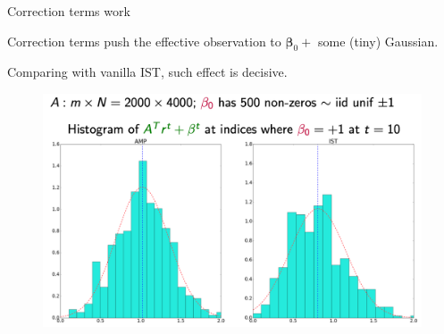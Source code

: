 \documentclass[aspectratio=43, 10pt]{beamer}
\begin{document}
\begin{frame}{Correction terms work}


Correction terms push the effective observation to $\boldsymbol{\beta}_0 + $ some (tiny) Gaussian. 

\vspace{2mm}
Comparing with vanilla IST, such effect is decisive.  

\begin{figure}
    \centering
    \includegraphics[width=0.84\linewidth]{figures/AMPvsISTA.png}
    \label{fig: amp vs. ist}
\end{figure}

    
\end{frame}
\end{document}
